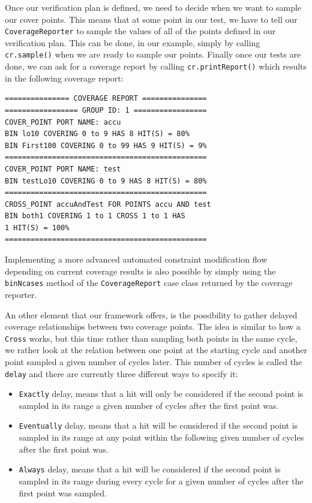 \documentclass[conference]{IEEEtran}
\begin{document}
Once our verification plan is defined, we need to decide when we want to sample our cover points. This means that at some point in our test, we have to tell our \texttt{CoverageReporter} to sample the values of all of the points defined in our verification plan. This can be done, in our example, simply by calling \texttt{cr.sample()} when we are ready to sample our points. Finally once our tests are done, we can ask for a coverage report by calling \texttt{cr.printReport()} which results in the following coverage report: 
\begin{verbatim}
=============== COVERAGE REPORT ===============
================= GROUP ID: 1 =================
COVER_POINT PORT NAME: accu
BIN lo10 COVERING 0 to 9 HAS 8 HIT(S) = 80%
BIN First100 COVERING 0 to 99 HAS 9 HIT(S) = 9%
===============================================
COVER_POINT PORT NAME: test
BIN testLo10 COVERING 0 to 9 HAS 8 HIT(S) = 80%
===============================================
CROSS_POINT accuAndTest FOR POINTS accu AND test
BIN both1 COVERING 1 to 1 CROSS 1 to 1 HAS
1 HIT(S) = 100%
===============================================
\end{verbatim}
Implementing a more advanced automated constraint modification flow depending on current coverage results is also possible by simply using the \texttt{binNcases} method of the \texttt{CoverageReport} case class returned by the coverage reporter. 

An other element that our framework offers, is the possibility to gather delayed coverage relationships between two coverage points. The idea is similar to how a \texttt{Cross} works, but this time rather than sampling both points in the same cycle, we rather look at the relation between one point at the starting cycle and another point sampled a given number of cycles later. This number of cycles is called the \texttt{delay} and there are currently three different ways to specify it:  
\begin{itemize}
  \item \texttt{Exactly} delay, means that a hit will only be considered if the second point is sampled in its range a given number of cycles after the first point was.
  \item \texttt{Eventually} delay, means that a hit will be considered if the second point is sampled in its range at any point within the following given number of cycles after the first point was.  
  \item \texttt{Always} delay, means that a hit will be considered if the second point is sampled in its range during every cycle for a given number of cycles after the first point was sampled.
\end{itemize}
\end{document}
